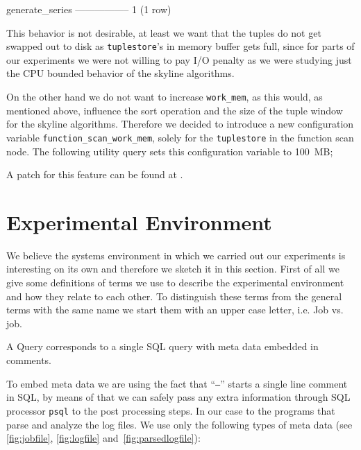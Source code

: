 \begin{interactive}
 generate_series
-----------------
               1
(1 row)
\end{interactive}

This behavior is not desirable, at least we want that the tuples do
not get swapped out to disk as
\texttt{tuplestore}'s in memory buffer gets full, since for parts
of our experiments we were not willing to pay I/O penalty as we were
studying just the CPU bounded behavior of the skyline algorithms.

On the other hand we do not want to increase \texttt{work\_mem}, as
this would, as mentioned above, influence the sort operation and the size
of the tuple window for the skyline algorithms. Therefore we decided
to introduce a new configuration variable
\texttt{function\_scan\_work\_mem}, solely for the \texttt{tuplestore}
in the function scan node. The following utility query sets this
configuration variable to 100~MB;

\begin{interactive}
\end{interactive}

\noindent
A patch for this feature can be found at
.


\section{Experimental Environment}
\label{sec:experimentalenvironment}
We believe the systems environment in which we carried out our
experiments is interesting on its own and therefore we sketch it in
this section.
%
First of all we give some definitions of terms we use to
describe the experimental environment and how they relate to each
other. To distinguish these terms from the general terms with the same
name we start them with an upper case letter, i.e. Job vs. job.

\begin{definition}[Query]
A Query corresponds to a single SQL query with meta data embedded in
comments.
\end{definition}

\noindent
To embed meta data we are using the fact that ``\texttt{--}'' starts a
single line comment in SQL, by means of that we can safely pass any
extra information through SQL processor \texttt{psql} to the post
processing steps. In our case to the programs that parse and analyze
the log files. We use only the following types of meta data (see
\autoref{fig:jobfile}, \ref{fig:logfile}
and~\ref{fig:parsedlogfile}):

